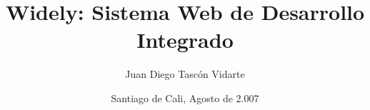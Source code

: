 \title{ Widely: Sistema Web de Desarrollo Integrado }

\author{ Juan Diego Tascón Vidarte }


\date{ Santiago de Cali, Agosto de 2.007 }
